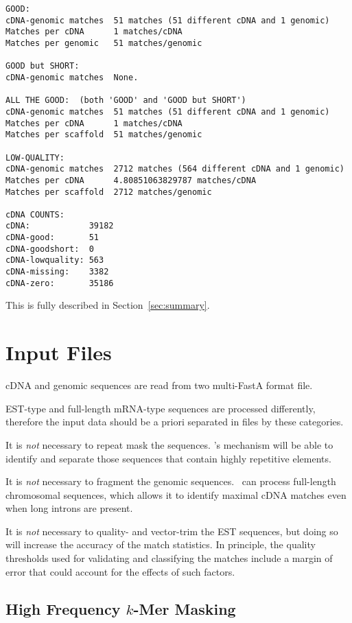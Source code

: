 \documentclass[twoside,11pt]{book}
\begin{document}
\footnotesize
\begin{verbatim}
GOOD:
cDNA-genomic matches  51 matches (51 different cDNA and 1 genomic)
Matches per cDNA      1 matches/cDNA
Matches per genomic   51 matches/genomic

GOOD but SHORT:
cDNA-genomic matches  None.

ALL THE GOOD:  (both 'GOOD' and 'GOOD but SHORT')
cDNA-genomic matches  51 matches (51 different cDNA and 1 genomic)
Matches per cDNA      1 matches/cDNA
Matches per scaffold  51 matches/genomic

LOW-QUALITY:
cDNA-genomic matches  2712 matches (564 different cDNA and 1 genomic)
Matches per cDNA      4.80851063829787 matches/cDNA
Matches per scaffold  2712 matches/genomic

cDNA COUNTS:
cDNA:            39182
cDNA-good:       51
cDNA-goodshort:  0
cDNA-lowquality: 563
cDNA-missing:    3382
cDNA-zero:       35186
\end{verbatim}
\normalsize

This is fully described in Section~\ref{sec:summary}.


\chapter{Input Files}
\label{chap:input}

cDNA and genomic sequences are read from two multi-FastA format file.

EST-type and full-length mRNA-type sequences are processed differently,
therefore the input data should be a priori separated in files by these
categories.

It is {\em not} necessary to repeat mask the sequences. \ESTmapper's mechanism 
will be able to identify and separate those sequences that contain highly
repetitive elements. 

It is {\em not} necessary to fragment the genomic sequences. \ESTmapper\
can process full-length chromosomal sequences, which allows it to identify 
maximal cDNA matches even when long introns are present.

It is {\em not} necessary to quality- and vector-trim the EST sequences, but
doing so will increase the accuracy of the match statistics. In principle, the
quality thresholds used for validating and classifying the matches include a
margin of error that could account for the effects of such factors.

\section{High Frequency $k$-Mer Masking}
\end{document}
